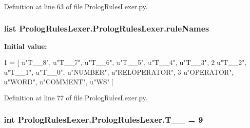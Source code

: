 Definition at line 63 of file Prolog\+Rules\+Lexer.\+py.

\hypertarget{class_prolog_rules_lexer_1_1_prolog_rules_lexer_aba72ee9a111abf678a06861eca7d2561}{}
\subsubsection[{rule\+Names}]{\setlength{\rightskip}{0pt plus 5cm}list Prolog\+Rules\+Lexer.\+Prolog\+Rules\+Lexer.\+rule\+Names\hspace{0.3cm}{\ttfamily [static]}}\label{class_prolog_rules_lexer_1_1_prolog_rules_lexer_aba72ee9a111abf678a06861eca7d2561}
{\bfseries Initial value\+:}
\begin{DoxyCode}
1 = [ \textcolor{stringliteral}{u"T\_\_8"}, \textcolor{stringliteral}{u"T\_\_7"}, \textcolor{stringliteral}{u"T\_\_6"}, \textcolor{stringliteral}{u"T\_\_5"}, \textcolor{stringliteral}{u"T\_\_4"}, \textcolor{stringliteral}{u"T\_\_3"}, 
2                   \textcolor{stringliteral}{u"T\_\_2"}, \textcolor{stringliteral}{u"T\_\_1"}, \textcolor{stringliteral}{u"T\_\_0"}, \textcolor{stringliteral}{u"NUMBER"}, \textcolor{stringliteral}{u"RELOPERATOR"}, 
3                   \textcolor{stringliteral}{u"OPERATOR"}, \textcolor{stringliteral}{u"WORD"}, \textcolor{stringliteral}{u"COMMENT"}, \textcolor{stringliteral}{u"WS"} ]
\end{DoxyCode}


Definition at line 77 of file Prolog\+Rules\+Lexer.\+py.

\hypertarget{class_prolog_rules_lexer_1_1_prolog_rules_lexer_a72a26fe003fdf57c9955238bbb237304}{}
\subsubsection[{T\+\_\+\+\_\+0}]{\setlength{\rightskip}{0pt plus 5cm}int Prolog\+Rules\+Lexer.\+Prolog\+Rules\+Lexer.\+T\+\_\+\+\_ = 9\hspace{0.3cm}{\ttfamily [static]}}\label{class_prolog_rules_lexer_1_1_prolog_rules_lexer_a72a26fe003fdf57c9955238bbb237304}


